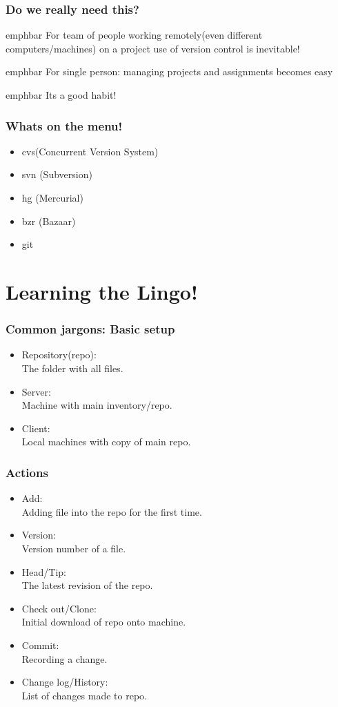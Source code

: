 \documentclass[14pt,compress]{beamer}
\newcommand{\emphbar}[1]
{\begin{beamercolorbox}[rounded=true]{emphbar} 
      {#1}
 \end{beamercolorbox}
}
\newcounter{time}
\begin{document}
\begin{frame}
  \frametitle{Do we really need this?}
  \emphbar{For team of people working remotely(even different computers/machines) on a project use of version control is inevitable!}
  \emphbar{For single person: managing projects and assignments becomes easy}
  \pause
  \emphbar{Its a good habit!}
\end{frame}

\begin{frame}
  \frametitle{Whats on the menu!}
  \begin{itemize}
  \item cvs(Concurrent Version System)
  \item svn (Subversion)
  \item hg (Mercurial)
  \item bzr (Bazaar)
  \item git
  \end{itemize}
\end{frame}

\section{Learning the Lingo!}

\begin{frame}
  \frametitle{Common jargons: Basic setup}
  \begin{itemize}
  \item Repository(repo):\\
        The folder with all files.
  \item Server:\\
        Machine with main inventory/repo.
  \item Client:\\
        Local machines with copy of main repo.
  \end{itemize}
\end{frame}

\begin{frame}
  \frametitle{Actions}
  \begin{itemize}
  \item Add:\\
    Adding file into the repo for the first time.
  \item Version:\\
    Version number of a file.
  \item Head/Tip:\\
    The latest revision of the repo.
  \item Check out/Clone:\\
    Initial download of repo onto machine.
  \item Commit:\\
    Recording a change.
  \item Change log/History:\\
    List of changes made to repo.
  \end{itemize}
\end{frame}
\end{document}
